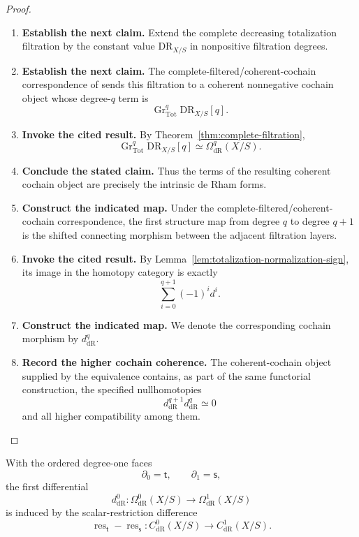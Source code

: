 \begin{proof}
\leavevmode
\begin{enumerate}[label=\textup{(\arabic*)}]
    \item \textbf{Establish the next claim.}
    Extend the complete decreasing totalization filtration by the constant value
    \(\mathrm{DR}_{X/S}\) in nonpositive filtration degrees.
    \item \textbf{Establish the next claim.}
    The
    complete-filtered/coherent-cochain correspondence of
    \cite[Theorem~4.7 and Remark~4.9]{AriottaCoherentCochains} sends this filtration to a coherent nonnegative
    cochain object whose degree-\(q\) term is
    \[
    \operatorname{Gr}^q_{\mathrm{Tot}}\mathrm{DR}_{X/S}[q].
    \]
    \item \textbf{Invoke the cited result.}
    By Theorem~\ref{thm:complete-filtration},
    \[
    \operatorname{Gr}^q_{\mathrm{Tot}}\mathrm{DR}_{X/S}[q]
    \simeq
    \Omega^q_{\mathrm{dR}}(X/S).
    \]
    \item \textbf{Conclude the stated claim.}
    Thus the terms of the resulting coherent cochain object are precisely the intrinsic
    de Rham forms.
    \item \textbf{Construct the indicated map.}
    Under the complete-filtered/coherent-cochain correspondence, the first structure
    map from degree \(q\) to degree \(q+1\) is the shifted connecting morphism between
    the adjacent filtration layers.
    \item \textbf{Invoke the cited result.}
    By
    Lemma~\ref{lem:totalization-normalization-sign}, its image in the homotopy category
    is exactly
    \[
    \sum_{i=0}^{q+1}(-1)^id^i.
    \]
    \item \textbf{Construct the indicated map.}
    We denote the corresponding cochain morphism by \(d^q_{\mathrm{dR}}\).
    \item \textbf{Record the higher cochain coherence.}
    The coherent-cochain object supplied by the equivalence contains, as part of the
    same functorial construction, the specified nullhomotopies
    \[
    d^{q+1}_{\mathrm{dR}}d^q_{\mathrm{dR}}\simeq0
    \]
    and all higher compatibility among them.
\end{enumerate}
\end{proof}

\begin{proposition}
\label{prop:degree-zero-infinitesimal-differential}
With the ordered degree-one faces
\[
  \partial_0=\mathsf t,
  \qquad
  \partial_1=\mathsf s,
\]
the first differential
\[
  d^0_{\mathrm{dR}}:
  \Omega^0_{\mathrm{dR}}(X/S)
  \longrightarrow
  \Omega^1_{\mathrm{dR}}(X/S)
\]
is induced by the scalar-restriction difference
\[
  \operatorname{res}_{\mathsf t}-\operatorname{res}_{\mathsf s}:
  C^0_{\mathrm{dR}}(X/S)
  \longrightarrow
  C^1_{\mathrm{dR}}(X/S).
\]
\end{proposition}

